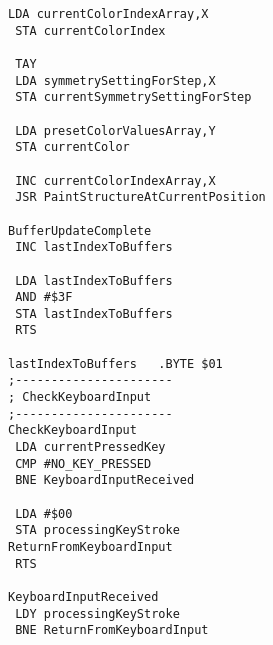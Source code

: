 \begin{minipage}[b]{0.33\linewidth}
\begin{lrbox}{\mybox}
\begin{lstlisting}[basicstyle=\ttfamily\tiny]
 LDA currentColorIndexArray,X
 STA currentColorIndex

 TAY 
 LDA symmetrySettingForStep,X
 STA currentSymmetrySettingForStep

 LDA presetColorValuesArray,Y
 STA currentColor

 INC currentColorIndexArray,X
 JSR PaintStructureAtCurrentPosition

BufferUpdateComplete   
 INC lastIndexToBuffers

 LDA lastIndexToBuffers
 AND #$3F
 STA lastIndexToBuffers
 RTS 

lastIndexToBuffers   .BYTE $01
;----------------------
; CheckKeyboardInput
;----------------------
CheckKeyboardInput   
 LDA currentPressedKey
 CMP #NO_KEY_PRESSED
 BNE KeyboardInputReceived

 LDA #$00
 STA processingKeyStroke
ReturnFromKeyboardInput   
 RTS 

KeyboardInputReceived   
 LDY processingKeyStroke
 BNE ReturnFromKeyboardInput
\end{lstlisting}
\end{lrbox}%
\scalebox{0.7}{\usebox{\mybox}}
\end{minipage}
\hspace{-0.8cm}
